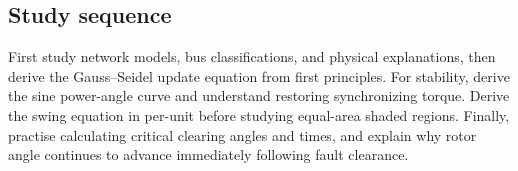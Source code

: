 \documentclass[11pt,a4paper]{article}
\begin{document}
\subsection{Study sequence}
First study network models, bus classifications, and physical explanations, then derive the Gauss--Seidel update equation from first principles. For stability, derive the sine power-angle curve and understand restoring synchronizing torque. Derive the swing equation in per-unit before studying equal-area shaded regions. Finally, practise calculating critical clearing angles and times, and explain why rotor angle continues to advance immediately following fault clearance.
\end{document}
